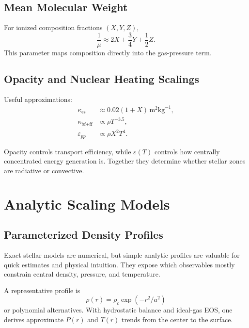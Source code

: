 \subsection{Mean Molecular Weight}
\begin{theory}
For ionized composition fractions $(X,Y,Z)$,
\begin{equation}
    \frac{1}{\mu}\approx 2X+\frac{3}{4}Y+\frac{1}{2}Z.
\end{equation}
This parameter maps composition directly into the gas-pressure term.
\end{theory}

\subsection{Opacity and Nuclear Heating Scalings}
\begin{theory}
Useful approximations:
\begin{align}
    \kappa_{\text{es}} &\approx 0.02(1+X)\,\text{m}^2\text{kg}^{-1}, \\
    \kappa_{\text{bf+ff}} &\propto \rho T^{-3.5}, \\
    \varepsilon_{pp} &\propto \rho X^2 T^4.
\end{align}
\end{theory}

\begin{remark}
Opacity controls transport efficiency, while $\varepsilon(T)$ controls how centrally concentrated energy generation is.
Together they determine whether stellar zones are radiative or convective.
\end{remark}

\section{Analytic Scaling Models}

\subsection{Parameterized Density Profiles}
\begin{intuition}
Exact stellar models are numerical, but simple analytic profiles are valuable for quick estimates and physical intuition.
They expose which observables mostly constrain central density, pressure, and temperature.
\end{intuition}

\begin{theory}
A representative profile is
\begin{equation}
    \rho(r)=\rho_c\exp(-r^2/a^2)
\end{equation}
or polynomial alternatives.
With hydrostatic balance and ideal-gas EOS, one derives approximate $P(r)$ and $T(r)$ trends from the center to the surface.
\end{theory}

